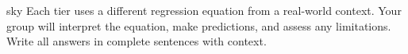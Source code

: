 \documentclass[10pt]{article}
\begin{document}
\namepartnerperiod

\vspace{0.18in}

\begin{scenariobox}[Context]{sky}
\small
Each tier uses a different regression equation from a real-world context. Your group will
interpret the equation, make predictions, and assess any limitations. Write all answers in
complete sentences with context.
\end{scenariobox}

\vspace{0.12in}

\end{document}
